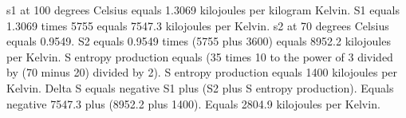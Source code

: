 s1 at 100 degrees Celsius equals 1.3069 kilojoules per kilogram Kelvin.  
S1 equals 1.3069 times 5755 equals 7547.3 kilojoules per Kelvin.  
s2 at 70 degrees Celsius equals 0.9549.  
S2 equals 0.9549 times (5755 plus 3600) equals 8952.2 kilojoules per Kelvin.  
S entropy production equals (35 times 10 to the power of 3 divided by (70 minus 20) divided by 2).  
S entropy production equals 1400 kilojoules per Kelvin.  
Delta S equals negative S1 plus (S2 plus S entropy production).  
Equals negative 7547.3 plus (8952.2 plus 1400).  
Equals 2804.9 kilojoules per Kelvin.
